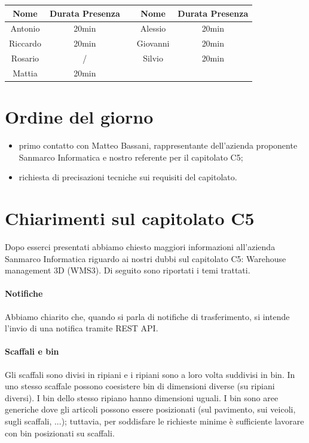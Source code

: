 \documentclass[12pt,a4paper]{article}
\begin{document}
\begin{center}
    \begin{tabular}{ |c|c|c|c|c| }
        \hline
        Nome     & Durata Presenza &  & Nome     & Durata Presenza \\
        \hline
        Antonio  & 20min       &  & Alessio  & 20min           \\
        \hline
        Riccardo & 20min       &  & Giovanni & 20min           \\
        \hline
        Rosario  & /           &  & Silvio   & 20min           \\
        \hline
        Mattia   & 20min       &  & &                 \\
        \hline
    \end{tabular}

\end{center}

\newpage

\section{Ordine del giorno}

\begin{itemize}
    \item primo contatto con Matteo Bassani, rappresentante dell'azienda proponente Sanmarco Informatica e nostro referente per il capitolato C5;
    \item richiesta di precisazioni tecniche sui requisiti del capitolato.
\end{itemize}

\section{Chiarimenti sul capitolato C5}
Dopo esserci presentati abbiamo chiesto maggiori informazioni all'azienda Sanmarco Informatica riguardo ai nostri dubbi sul capitolato C5: Warehouse management 3D (WMS3).
Di seguito sono riportati i temi trattati.

\paragraph{Notifiche}
Abbiamo chiarito che, quando si parla di notifiche di trasferimento, si intende l'invio di una notifica tramite REST API.

\paragraph{Scaffali e bin}
Gli scaffali sono divisi in ripiani e i ripiani sono a loro volta suddivisi in bin. In uno stesso scaffale possono coesistere bin di dimensioni diverse (su ripiani diversi). I bin dello stesso ripiano hanno dimensioni uguali. I bin sono aree generiche dove gli articoli possono essere posizionati (sul pavimento, sui veicoli, sugli scaffali, ...); tuttavia, per soddisfare le richieste minime è sufficiente lavorare con bin posizionati su scaffali.
\end{document}
